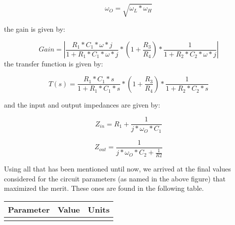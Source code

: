 \begin {equation}
	\omega_O= \sqrt{\omega_L * \omega_H }  
	\label{eq:CentralF}
\end{equation}
 
the gain is given by:

\begin {equation}
	Gain= |\frac{R_1*C_1*\omega*j}{1+R_1*C_1*\omega*j}*(1+\frac{R_3}{R_4})*\frac{1}{1+R_2*C_2*\omega*j}|   	
	\label{eq:gain}
\end{equation} 
the transfer function is given by: 

\begin {equation}
	T(s) = \frac{R_1*C_1*s}{1+R_1*C_1*s}*(1+\frac{R_3}{R_4})*\frac{1}{1+R_2*C_2*s}   	
	\label{eq:gain}
\end{equation} 

and the input and output impedances are given by: 

\begin {equation}
	Z_{in} = R_1 + \frac{1}{j*\omega_O*C_1} 
	\label{eq:impedances_in}
\end{equation}  

\begin {equation}
       Z_{out} = \frac{1}{j*\omega_O*C_2+\frac{1}{R2}}	
	\label{eq:impedances_out}
\end{equation}  

Using all that has been mentioned until now, we arrived at the final values considered for the circuit parameters (as named in the above figure) that maximized the merit. These ones are found in the following table. 

\hfill
 \parbox{1\linewidth}{
  \centering
  \begin{tabular}{|l|l|r|}
    \hline    
    {\bf Parameter} & {\bf Value} & {\bf Units }\\ \hline
    
  \label{tab:params}
  \end{tabular}
  }
\par

